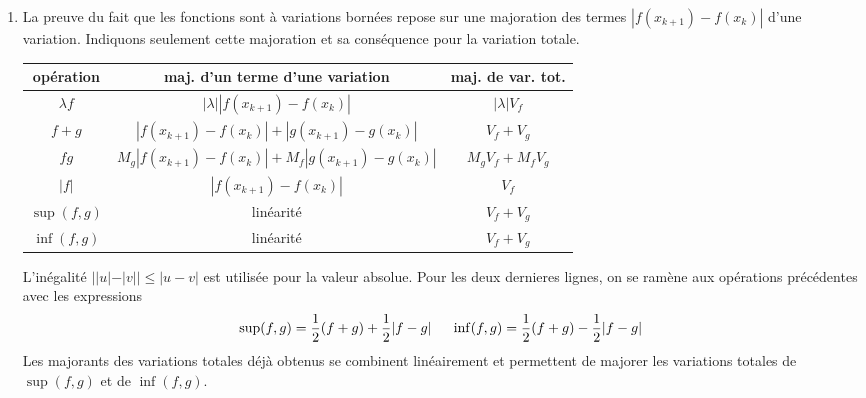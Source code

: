 \begin{enumerate}
\begin{enumerate}
  \item La preuve du fait que les fonctions sont à variations bornées repose sur une majoration des termes $|f(x_{k+1}) - f(x_k)| $ d'une variation. Indiquons seulement cette majoration et sa conséquence pour la variation totale. \bigskip
\begin{center}
\renewcommand{\arraystretch}{1.5}
\begin{tabular}{|c|c|c|} \hline
opération & maj. d'un terme d'une variation & maj. de var. tot. \\ \hline
  $\lambda f$ & $|\lambda||f(x_{k+1}) - f(x_k)|$ & $|\lambda| V_f$ \\ \hline
$f + g$ & $|f(x_{k+1}) - f(x_k)| + |g(x_{k+1}) - g(x_k)|$ & $V_f + V_g$ \\ \hline 
$fg$ & $M_g|f(x_{k+1}) - f(x_k)| + M_f|g(x_{k+1}) - g(x_k)|$ & $M_gV_f + M_fV_g$ \\ \hline
$|f|$ & $|f(x_{k+1}) - f(x_k)|$ & $V_f$ \\ \hline
$\sup(f,g)$ & linéarité & $V_f + V_g$ \\ \hline
$\inf(f,g)$ & linéarité & $V_f + V_g$ \\ \hline
\end{tabular} 
\end{center} \bigskip
L'inégalité $||u|-|v||\leq |u-v|$ est utilisée pour la valeur absolue. Pour les deux dernieres lignes, on se ramène aux opérations précédentes avec les expressions
\begin{displaymath}
  \sup(f,g) = \frac{1}{2}(f+g) + \frac{1}{2}|f-g| \hspace{0.5cm} \inf(f,g) = \frac{1}{2}(f+g) - \frac{1}{2}|f-g|
\end{displaymath}
Les majorants des variations totales déjà obtenus se combinent linéairement et permettent de majorer les variations totales de $\sup(f,g)$ et de $\inf(f,g)$.
\end{enumerate}
\end{enumerate}

